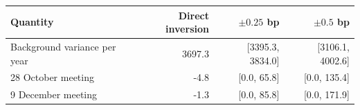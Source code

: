 \begin{tabular}{lrrr}\toprule Quantity & Direct inversion & $\pm0.25$ bp & $\pm0.5$ bp\\\midrule
Background variance per year & 3697.3 & [3395.3, 3834.0] & [3106.1, 4002.6] \\
28 October meeting & -4.8 & [0.0, 65.8] & [0.0, 135.4] \\
9 December meeting & -1.3 & [0.0, 85.8] & [0.0, 171.9] \\
\bottomrule\end{tabular}
